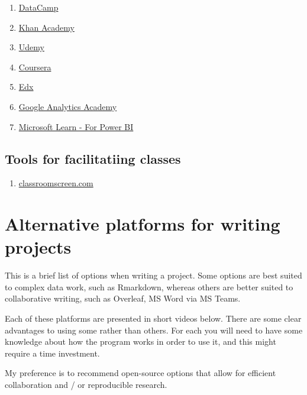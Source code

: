 \documentclass[
]{book}
\providecommand{\tightlist}{%
  \setlength{\itemsep}{0pt}\setlength{\parskip}{0pt}}
\begin{document}
\begin{enumerate}
\def\labelenumi{\arabic{enumi}.}
\tightlist
\item
  \href{https://www.datacamp.com}{DataCamp}
\item
  \href{https://www.khanacademy.org}{Khan Academy}
\item
  \href{https://www.udemy.com}{Udemy}
\item
  \href{https://www.coursera.org}{Coursera}
\item
  \href{https://www.edx.org}{Edx}
\item
  \href{https://analytics.google.com/analytics/academy/}{Google Analytics Academy}
\item
  \href{https://docs.microsoft.com/en-gb/learn/powerplatform/power-bi?WT.mc_id=sitertzn_learntab_guidedlearning-card-powerbi}{Microsoft Learn - For Power BI}
\end{enumerate}

\hypertarget{tools-for-facilitatiing-classes}{%
\section{Tools for facilitatiing classes}\label{tools-for-facilitatiing-classes}}

\begin{enumerate}
\def\labelenumi{\arabic{enumi}.}
\tightlist
\item
  \href{www.classroomscreen.com}{classroomscreen.com}
\end{enumerate}

\hypertarget{alternative-platforms-for-writing-projects}{%
\chapter{Alternative platforms for writing projects}\label{alternative-platforms-for-writing-projects}}

This is a brief list of options when writing a project. Some options are best suited to complex data work, such as Rmarkdown, whereas others are better suited to collaborative writing, such as Overleaf, MS Word via MS Teams.

Each of these platforms are presented in short videos below. There are some clear advantages to using some rather than others. For each you will need to have some knowledge about how the program works in order to use it, and this might require a time investment.

My preference is to recommend open-source options that allow for efficient collaboration and / or reproducible research.
\end{document}
